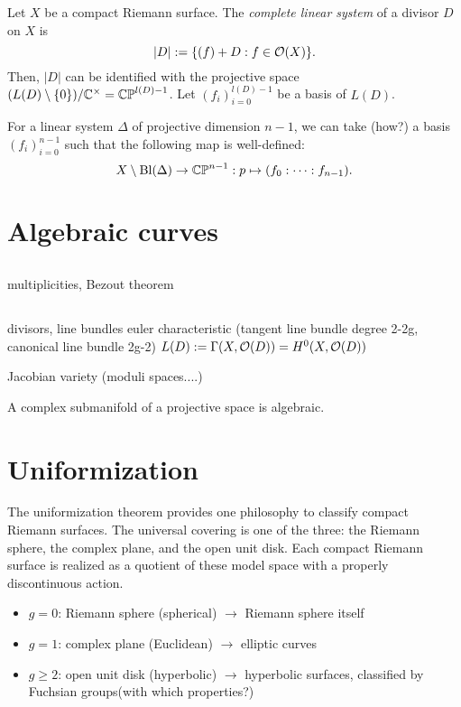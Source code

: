 \documentclass{../../large}
\begin{document}
\begin{prb}
Let $X$ be a compact Riemann surface.
The \emph{complete linear system} of a divisor $D$ on $X$ is
\[|D|:=\{(f)+D:f\in\mathcal{O}(X)\}.\]
Then, $|D|$ can be identified with the projective space $(L(D)\setminus\{0\})/\mathbb{C}^\times=\mathbb{CP}^{l(D)-1}$.
Let $(f_i)_{i=0}^{l(D)-1}$ be a basis of $L(D)$.

For a linear system $\Delta$ of projective dimension $n-1$, we can take (how?) a basis $(f_i)_{i=0}^{n-1}$ such that the following map is well-defined:
\[X\setminus\mathrm{Bl}(\Delta)\to\mathbb{CP}^{n-1}:p\mapsto(f_0:\cdots:f_{n-1}).\]
\end{prb}


\chapter{Algebraic curves}

\section{}
multiplicities, Bezout theorem

\section{}
divisors, line bundles
euler characteristic
(tangent line bundle degree 2-2g, canonical line bundle 2g-2)
$L(D):=\Gamma(X,\mathcal{O}(D))=H^0(X,\mathcal{O}(D))$

Jacobian variety (moduli spaces....)


\begin{prb}
A complex submanifold of a projective space is algebraic.
\end{prb}


\chapter{Uniformization}

The uniformization theorem provides one philosophy to classify compact Riemann surfaces.
The universal covering is one of the three: the Riemann sphere, the complex plane, and the open unit disk.
Each compact Riemann surface is realized as a quotient of these model space with a properly discontinuous action.

\begin{itemize}
\item $g=0$: Riemann sphere (spherical) $\to$ Riemann sphere itself
\item $g=1$: complex plane (Euclidean) $\to$ elliptic curves
\item $g\ge2$: open unit disk (hyperbolic) $\to$ hyperbolic surfaces, classified by Fuchsian groups(with which properties?)
\end{itemize}
\end{document}
